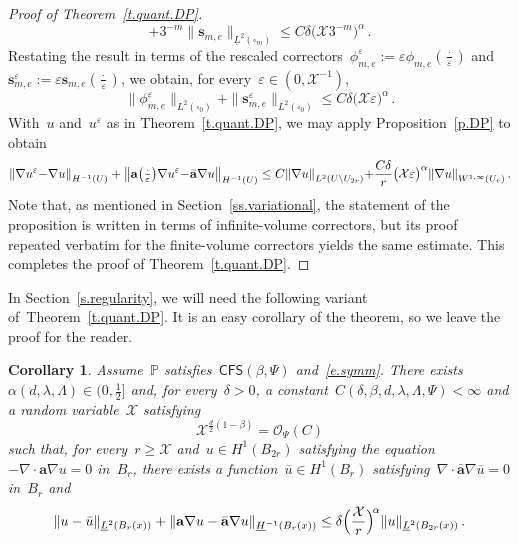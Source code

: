 \documentclass[11pt]{article} %
\let\oldsquare\square %
\renewcommand{\square}{\oldsquare}
\numberwithin{equation}{section}
\newtheorem{corollary}[theorem]{Corollary}
\theoremstyle{definition}
\let\originalleft\left
\let\originalright\right
\renewcommand{\left}{\mathopen{}\mathclose\bgroup\originalleft}
\renewcommand{\right}{\aftergroup\egroup\originalright}
\newcommand{\eps}{\varepsilon}
\newcommand{\s}{\mathbf{s}}
\newcommand{\ep}{\eps}
\renewcommand{\a}{\mathbf{a}}
\newcommand{\ahom}{\bar{\a}}
\newcommand{\cu}{\square}
\renewcommand{\P}{\mathbb{P}}
\newcommand{\X}{\mathcal{X}}
\renewcommand{\O}{\mathcal{O}}
\newcommand{\CFS}{\mathsf{CFS}}
\begin{document}
\begin{proof}[{Proof of Theorem~\ref{t.quant.DP}}]
\begin{equation}
+
3^{-m} \| \s_{m,e} \|_{\underline{L}^2(\cu_m)} 
\leq
C \delta \bigl( \X 3^{-m} \bigr)^{\alpha}
\,.
\end{equation}
Restating the result in terms of the rescaled correctors~$\phi_{m,e}^\ep:= \ep \phi_{m,e}(\tfrac \cdot \ep)$ and~$\s_{m,e}^\ep:= \ep \s_{m,e}(\tfrac \cdot \ep)$, we obtain, for every~$\ep \in (0,\X^{-1})$, 
\begin{equation*}
\| \phi_{m,e}^\ep \|_{{L}^2(\cu_0)} 
+
\| \s_{m,e}^\ep \|_{{L}^2(\cu_0)} 
\leq 
C \delta \bigl( \X \ep \bigr)^{\alpha}
\,.
\end{equation*}
With~$u$ and~$u^\ep$ as in Theorem~\ref{t.quant.DP}, we may apply Proposition~\ref{p.DP} to obtain
\begin{align*}
\left\| \nabla u^\ep {-} \nabla  u  \right\|_{H^{-1}(U)}  
+ \left\| \a\left(\tfrac\cdot\ep\right) \nabla u^\ep {-} \ahom \nabla  u  \right\|_{H^{-1}(U)}
\leq 
C \left\| \nabla u \right\|_{L^{2}(U \setminus U_{2r})} 
{+}
\frac{C\delta}{r}
\bigl( \X \ep \bigr)^{\alpha}
\left\|  \nabla u \right\|_{W^{1,\infty}(U_r)}
\,.
\end{align*}
Note that, as mentioned in Section~\ref{ss.variational}, the statement of the proposition is written in terms of infinite-volume correctors, but its proof repeated verbatim for the finite-volume correctors yields the same estimate. This completes the proof of Theorem~\ref{t.quant.DP}. 
\end{proof}


In Section~\ref{s.regularity}, we will need the following variant of~Theorem~\ref{t.quant.DP}. It is an easy corollary of the theorem, so we leave the proof for the reader. 

\begin{corollary}
\label{c.quant.DP.interior}
Assume~$\P$ satisfies~$\CFS(\beta,\Psi)$ and~\eqref{e.symm}. 
There exists~$\alpha(d,\lambda,\Lambda) \in (0,\tfrac12]$ and, for every~$\delta>0$, a constant~$C(\delta,\beta,d,\lambda,\Lambda,\Psi)<\infty$ and a random variable~$\X$ satisfying 
\begin{equation}
\label{e.mmmbound2}
\X^{\frac d2 (1-\beta)}
= \O_\Psi(C)
\end{equation}
such that, for every~$r \geq \X$ and~$u \in H^1(B_{2r})$ satisfying the equation~$-\nabla \cdot\a\nabla u = 0$ in~$B_r$, there exists a function~$\overline{u} \in H^1(B_r)$ satisfying~$\nabla \cdot \ahom\nabla \overline{u} = 0$ in~$B_r$ and 
\begin{equation*}
\| u - \bar u \|_{\underline{L}^2(B_r(x))} 
+  
\|\a \nabla u - \ahom \nabla u \|_{\underline{H}^{-1}(B_r(x))} 
\leq 
\delta \Bigl( \frac{\X}{r} \Bigr)^{\!\alpha  }
\| u \|_{\underline{L}^2(B_{2r}(x))} 
\,.
\end{equation*}
\end{corollary}
\end{document}
